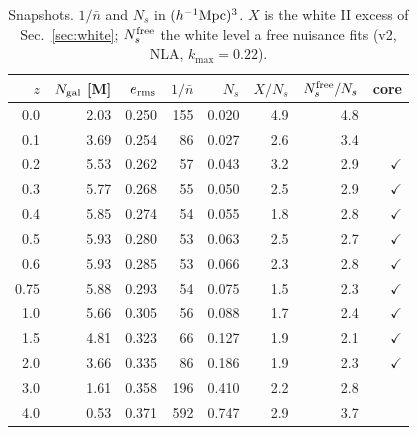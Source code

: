 \documentclass[11pt]{article}
\begin{document}
\begin{table}[H]\centering\small
\begin{tabular}{rrrrrrrr}
\toprule
$z$ & $N_{\rm gal}$ [M] & $e_{\rm rms}$ & $1/\bar n$ & $N_s$ & $X/N_s$ & $N_s^{\rm free}/N_s$ & core\\
\midrule
0.0 & 2.03 & 0.250 & 155 & 0.020 & 4.9 & 4.8 & \\
0.1 & 3.69 & 0.254 & 86 & 0.027 & 2.6 & 3.4 & \\
0.2 & 5.53 & 0.262 & 57 & 0.043 & 3.2 & 2.9 & $\checkmark$\\
0.3 & 5.77 & 0.268 & 55 & 0.050 & 2.5 & 2.9 & $\checkmark$\\
0.4 & 5.85 & 0.274 & 54 & 0.055 & 1.8 & 2.8 & $\checkmark$\\
0.5 & 5.93 & 0.280 & 53 & 0.063 & 2.5 & 2.7 & $\checkmark$\\
0.6 & 5.93 & 0.285 & 53 & 0.066 & 2.3 & 2.8 & $\checkmark$\\
0.75 & 5.88 & 0.293 & 54 & 0.075 & 1.5 & 2.3 & $\checkmark$\\
1.0 & 5.66 & 0.305 & 56 & 0.088 & 1.7 & 2.4 & $\checkmark$\\
1.5 & 4.81 & 0.323 & 66 & 0.127 & 1.9 & 2.1 & $\checkmark$\\
2.0 & 3.66 & 0.335 & 86 & 0.186 & 1.9 & 2.3 & $\checkmark$\\
3.0 & 1.61 & 0.358 & 196 & 0.410 & 2.2 & 2.8 & \\
4.0 & 0.53 & 0.371 & 592 & 0.747 & 2.9 & 3.7 & \\
\bottomrule
\end{tabular}
\caption{Snapshots. $1/\bar n$ and $N_s$ in $(h^{-1}{\rm Mpc})^3$. $X$ is the white II excess of Sec.~\ref{sec:white}; $N_s^{\rm free}$ the white level a free nuisance fits (v2, NLA, $k_{\max}=0.22$).}
\label{tab:snaps}
\end{table}
\end{document}
